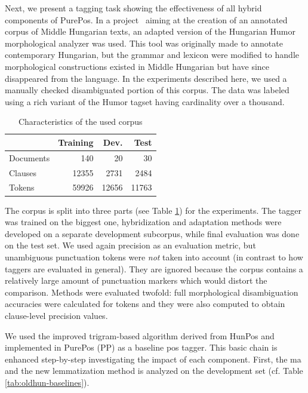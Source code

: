 Next, we present a tagging task showing the effectiveness of all hybrid components of PurePos. 
In a project~\cite{Novak2013} aiming at the creation of an annotated corpus of Middle Hungarian texts, an adapted version of the Hungarian Humor morphological analyzer was used. 
This tool was originally made to annotate contemporary Hungarian, but the grammar and lexicon were modified to handle morphological constructions existed in Middle Hungarian but have since disappeared from the language. 
In the experiments described here, we used a manually checked disambiguated portion of this corpus. The data was labeled using a rich variant of the Humor tagset having cardinality over a thousand.

\begin{table}[H]
\centering
\caption{Characteristics of the used corpus}\label{tab:oldhun-corpus}
\begin{tabular}{l r r r}
\hline
& Training & Dev. & Test \\
\hline
Documents & 140 & 20 & 30 \\
Clauses & 12355 & 2731 & 2484 \\
Tokens & 59926 & 12656 &  11763\\
\hline
\end{tabular}
\end{table}

The corpus is split into three parts (see Table \ref{tab:oldhun-corpus}) for the experiments. 
The tagger was trained on the biggest one, hybridization and adaptation methods were developed on a separate development subcorpus, while final evaluation was done on the test set.
We used again precision as an evaluation metric, but unambiguous punctuation tokens were \emph{not} taken into account (in contrast to how taggers are evaluated in general). 
They are ignored because the corpus contains a relatively large amount of punctuation markers which would distort the comparison.
Methods were evaluated twofold: full morphological disambiguation accuracies were calculated for tokens and they were also computed to obtain clause-level precision values.

We used the improved trigram-based algorithm derived from HunPos and implemented in PurePos (PP) as a baseline \gls{pos} tagger. 
This basic chain is enhanced step-by-step investigating the impact of each component.
First, the \acrshort{ma} and the new lemmatization method is analyzed on the development set (cf. Table \ref{tab:oldhun-baselines}). 


